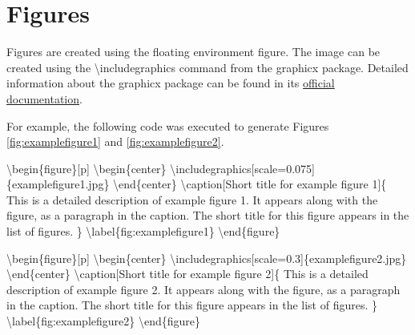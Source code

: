 \documentclass[twoside,openany]{thesis}
\begin{document}
\section{Figures}\label{sec:Figures}

Figures are created using the floating environment {\ttfamily figure}.
The image can be created using the {\ttfamily\textbackslash includegraphics} command from the {\ttfamily graphicx} package.
Detailed information about the {\ttfamily graphicx} package can be found in its \href{http://packages.oth-regensburg.de/ctan/macros/latex/required/graphics/grfguide.pdf}{official documentation}.

For example, the following code was executed to generate Figures \ref{fig:examplefigure1} and \ref{fig:examplefigure2}.

{\ttfamily
    \textbackslash begin\{figure\}[p]\linebreak
        \null\quad\textbackslash begin\{center\}\linebreak
            \null\quad\quad\textbackslash includegraphics[scale=0.075]\{examplefigure1.jpg\}\linebreak
        \null\quad\textbackslash end\{center\}\linebreak
        \null\quad\textbackslash caption[Short title for example figure 1]\{\linebreak
            \null\quad\quad This is a detailed description of example figure 1.\linebreak
            \null\quad\quad It appears along with the figure, as a paragraph in the caption.\linebreak
            \null\quad\quad The short title for this figure appears in the list of figures.\linebreak
        \null\quad\}\linebreak
        \null\quad\textbackslash label\{fig:examplefigure1\}\linebreak
    \textbackslash end\{figure\}
}

{\ttfamily
    \textbackslash begin\{figure\}[p]\linebreak
        \null\quad\textbackslash begin\{center\}\linebreak
            \null\quad\quad\textbackslash includegraphics[scale=0.3]\{examplefigure2.jpg\}\linebreak
        \null\quad\textbackslash end\{center\}\linebreak
        \null\quad\textbackslash caption[Short title for example figure 2]\{\linebreak
            \null\quad\quad This is a detailed description of example figure 2.\linebreak
            \null\quad\quad It appears along with the figure, as a paragraph in the caption.\linebreak
            \null\quad\quad The short title for this figure appears in the list of figures.\linebreak
        \null\quad\}\linebreak
        \null\quad\textbackslash label\{fig:examplefigure2\}\linebreak
    \textbackslash end\{figure\}
}
\end{document}

